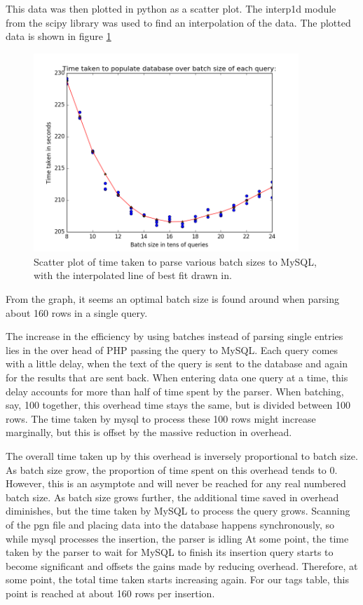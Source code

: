 \documentclass{article}
\begin{document}
This data was then plotted in python as a scatter plot.  The interp1d module
from the scipy library was used to find an interpolation of the data.  The
plotted data is shown in figure \ref{figure:1}

\begin{figure}[h]
	\includegraphics[width=10cm]{graph_batch_interpolation}
	\caption{Scatter plot of time taken to parse various batch sizes to
	MySQL, with the interpolated line of best fit drawn in.}
	\label{figure:1}
\end{figure}

From the graph, it seems an optimal batch size is found around when parsing
about 160 rows in a single query.

The increase in the efficiency by using batches instead of parsing single
entries lies in the over head of PHP passing the query to MySQL.  Each
query comes with a little delay, when the text of the query is sent to the
database and again for the results that are sent back.  When entering data
one query at a time, this delay accounts for more than half of time spent
by the parser.  When batching, say, 100 together, this overhead time stays
the same, but is divided between 100 rows.  The time taken by mysql to
process these 100 rows might increase marginally, but this is offset by the
massive reduction in overhead.

The overall time taken up by this overhead is inversely proportional to
batch size.  As batch size grow, the proportion of time spent on this overhead tends to
0. However, this is an asymptote and will never be reached for any real
numbered batch size.  As batch size grows further, the additional time
saved in overhead diminishes, but the time taken by MySQL to process the
query grows.  Scanning of the pgn file and placing data into the database
happens synchronously, so while mysql processes the insertion, the parser is
idling  At some point, the time taken by the parser to wait for MySQL to
finish its insertion query starts to become significant and offsets the
gains made by reducing overhead.  Therefore, at some point, the total time
taken starts increasing again.  For our tags table, this point is reached
at about 160 rows per insertion.
\end{document}
